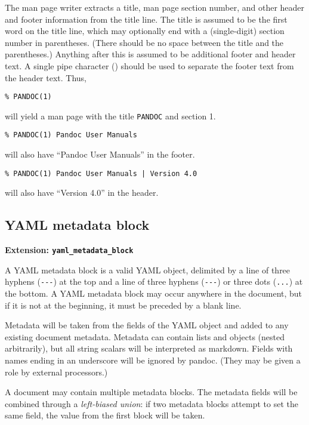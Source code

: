\documentclass[]{article}
\begin{document}
The man page writer extracts a title, man page section number, and other
header and footer information from the title line. The title is assumed
to be the first word on the title line, which may optionally end with a
(single-digit) section number in parentheses. (There should be no space
between the title and the parentheses.) Anything after this is assumed
to be additional footer and header text. A single pipe character
(\texttt{\textbar{}}) should be used to separate the footer text from
the header text. Thus,

\begin{verbatim}
% PANDOC(1)
\end{verbatim}

will yield a man page with the title \texttt{PANDOC} and section 1.

\begin{verbatim}
% PANDOC(1) Pandoc User Manuals
\end{verbatim}

will also have ``Pandoc User Manuals'' in the footer.

\begin{verbatim}
% PANDOC(1) Pandoc User Manuals | Version 4.0
\end{verbatim}

will also have ``Version 4.0'' in the header.

\subsection{YAML metadata block}

\textbf{Extension: \texttt{yaml\_metadata\_block}}

A YAML metadata block is a valid YAML object, delimited by a line of
three hyphens (\texttt{-{}-{}-}) at the top and a line of three hyphens
(\texttt{-{}-{}-}) or three dots (\texttt{...}) at the bottom. A YAML
metadata block may occur anywhere in the document, but if it is not at
the beginning, it must be preceded by a blank line.

Metadata will be taken from the fields of the YAML object and added to
any existing document metadata. Metadata can contain lists and objects
(nested arbitrarily), but all string scalars will be interpreted as
markdown. Fields with names ending in an underscore will be ignored by
pandoc. (They may be given a role by external processors.)

A document may contain multiple metadata blocks. The metadata fields
will be combined through a \emph{left-biased union}: if two metadata
blocks attempt to set the same field, the value from the first block
will be taken.
\end{document}
